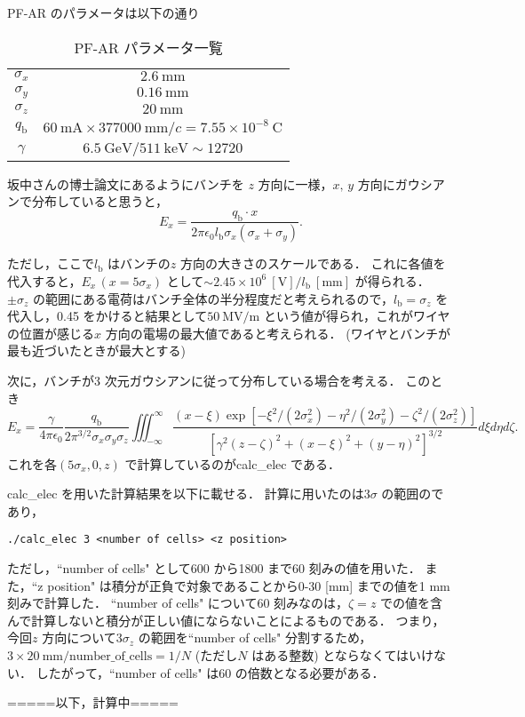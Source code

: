 \documentclass{jsarticle}
\begin{document}
PF-AR のパラメータは以下の通り
\begin{table}[h]
\centering
\caption{PF-AR パラメータ一覧\label{tab:pfarparameter}}
\begin{tabular}{cc} \hline
$\sigma_x$ & $2.6~\mathrm{mm}$ \\ 
$\sigma_y$ & $0.16~\mathrm{mm}$ \\ 
$\sigma_z$ & $20~\mathrm{mm}$ \\ 
$q_\mathrm{b}$ & $60~\mathrm{mA} \times 377000~\mathrm{mm}/c = 7.55 \times 10^{-8}~\mathrm{C}$ \\
$\gamma$ & $6.5~\mathrm{GeV}/511~\mathrm{keV} \sim 12720$ \\ \hline
\end{tabular}
\end{table}

坂中さんの博士論文にあるようにバンチを $z$ 方向に一様，$x,\,y$ 方向にガウシアンで分布していると思うと，
\begin{equation}
E_x = \frac{q_\mathrm{b} \cdot x}{2\pi \epsilon_0 l_\mathrm{b}\sigma_x(\sigma_x + \sigma_y)}.
\end{equation}

ただし，ここで$l_\mathrm{b}$ はバンチの$z$ 方向の大きさのスケールである．
これに各値を代入すると，$E_x\,(x = 5\sigma_x)$ として$\sim 2.45 \times 10^6~[\mathrm{V}] /l_\mathrm{b}~[\mathrm{mm}]$ が得られる．
$\pm \sigma_z$ の範囲にある電荷はバンチ全体の半分程度だと考えられるので，$l_\mathrm{b} = \sigma_z$ を代入し，0.45 をかけると結果として$50~\mathrm{MV/m}$ という値が得られ，これがワイヤの位置が感じる$x$ 方向の電場の最大値であると考えられる．
(ワイヤとバンチが最も近づいたときが最大とする)

次に，バンチが3 次元ガウシアンに従って分布している場合を考える．
このとき
\begin{equation}
E_x = \frac{\gamma}{4\pi\epsilon_0}\frac{q_\mathrm{b}}{2\pi^{3/2}\sigma_x\sigma_y\sigma_z}\iiint_{-\infty}^\infty\frac{(x - \xi)\exp[-\xi^2/(2\sigma_x^2)-\eta^2/(2\sigma_y^2)-\zeta^2/(2\sigma_z^2)]}{[\gamma^2(z-\zeta)^2 + (x - \xi)^2 + (y - \eta)^2]^{3/2}}d\xi d\eta d\zeta.
\end{equation}
これを各$(5\sigma_x, 0, z)$ で計算しているのがcalc\_elec である．

\newpage

calc\_elec を用いた計算結果を以下に載せる．
計算に用いたのは$3 \sigma$ の範囲のであり，
\begin{lstlisting}
./calc_elec 3 <number of cells> <z position>
\end{lstlisting}
ただし，``number of cells" として600 から1800 まで60 刻みの値を用いた．
また，``z position" は積分が正負で対象であることから0-30 [mm] までの値を1 mm 刻みで計算した．
``number of cells" について60 刻みなのは，$\zeta = z$ での値を含んで計算しないと積分が正しい値にならないことによるものである．
つまり，今回$z$ 方向について$3\sigma_z$ の範囲を``number of cells" 分割するため，$3 \times 20~\mathrm{mm} / \mathrm{number\_of\_cells} = 1/N$ (ただし$N$ はある整数) とならなくてはいけない．
したがって，``number of cells" は60 の倍数となる必要がある．
\begin{center}
=====以下，計算中=====
\end{center}
\end{document}
